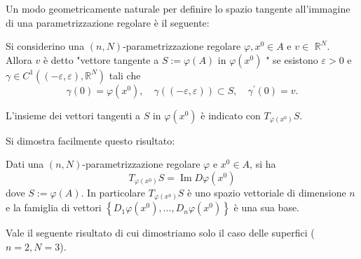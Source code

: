 \begin{oss}
    Un modo geometricamente naturale per definire lo spazio tangente all'immagine di una parametrizzazione regolare è il seguente:
    \begin{boxdef*}Si considerino una $(n, N)$-parametrizzazione regolare $\varphi, x^{0} \in A$ e $v \in$ $\mathbb{R}^{N}$. Allora $v$ è detto "vettore tangente a $S:=\varphi(A)$ in $\varphi\left(x^{0}\right)$ " se esistono $\varepsilon>0$ e $\gamma \in C^{1}\left((-\varepsilon, \varepsilon), \mathbb{R}^{N}\right)$ tali che
        \[\gamma(0)=\varphi\left(x^{0}\right), \quad \gamma((-\varepsilon, \varepsilon)) \subset S, \quad \gamma^{\prime}(0)=v .\]
    \end{boxdef*}
    L'insieme dei vettori tangenti a $S$ in $\varphi\left(x^{0}\right)$ è indicato con $T_{\varphi\left(x^{0}\right)} S$.
    
    Si dimostra facilmente questo risultato:
    
    \begin{proposition*}
    Dati una $(n, N)$-parametrizzazione regolare $\varphi$ e $x^{0} \in A$, si ha
    \[T_{\varphi\left(x^{0}\right)} S=\operatorname{Im} D \varphi\left(x^{0}\right)\]
    dove $S:=\varphi(A)$. In particolare $T_{\varphi\left(x^{0}\right)} S$ è uno spazio vettoriale di dimensione $n$ e la famiglia di vettori $\left\{D_{1} \varphi\left(x^{0}\right), \ldots, D_{n} \varphi\left(x^{0}\right)\right\}$ è una sua base.
    \end{proposition*}
\end{oss}
    
Vale il seguente risultato di cui dimostriamo solo il caso delle superfici ($n=2, N=3$).

